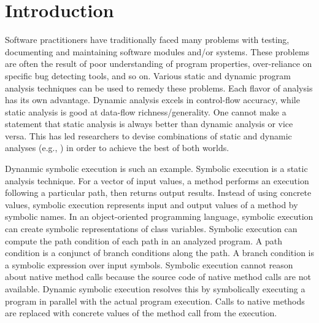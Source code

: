 \documentclass[proposal]{umthesis} %
\begin{document}
\frontmatter
\maketitle
\copyrightpage     %
\signaturepage

\mainmatter   %

\chapter{Introduction}
\label{chp:introduction}

Software practitioners have traditionally faced many problems with testing, documenting and maintaining software modules and/or systems.  These problems are often the result of poor understanding of program properties, over-reliance on specific bug detecting tools, and so on. Various static and dynamic program analysis techniques can be used to remedy these problems. Each flavor of analysis has its own advantage. Dynamic analysis excels in control-flow accuracy, while static analysis is good at data-flow richness/generality\cite{smaragdakis07combining}. One cannot make a statement that static analysis is always better than dynamic analysis or vice versa. This has led researchers to devise combinations of static and dynamic analyses (e.g., \cite{csallner05check,csallner06dsd-crasher,godefroid05dart,cadar05execution,tomb07variably,tillmann08pex,Islam14Generating}) in order to achieve the best of both worlds.  

Dynanmic symbolic execution\cite{Schwartz:2010:YEW:1849417.1849981} is such an example. Symbolic execution is a static analysis technique.  For a vector of input values, a method performs an execution following a particular path, then returns output results.  Instead of using concrete values, symbolic execution represents input and output values of a method by symbolic names. In an object-oriented programming language, symbolic execution can create symbolic representations of class variables. Symbolic execution can compute the path condition of each path in an analyzed program.  A path condition is a conjunct of branch conditions along the path.  A branch condition is a symbolic expression over input symbols. Symbolic execution cannot reason about native method calls because the source code of native method calls are not available.  Dynamic symbolic execution resolves this by symbolically executing a program in parallel with the actual program execution.  Calls to native methods are replaced with concrete values of the method call from the execution.  
\end{document}
